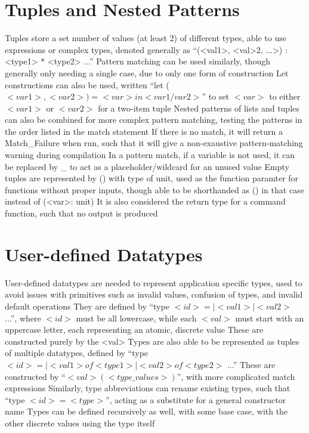\documentclass[11 pt, twoside]{article}
\newenvironment{outline*}
{
	\begin{outline}[enumerate]
	}
	{\end{outline}
}
\begin{document}
\section{Tuples and Nested Patterns}
\begin{outline*}
\1 Tuples store a set number of values (at least 2) of different types, able to use expressions or complex types, denoted generally as ``(<val1>, <val>2, ...>) : <type1> * <type2> ...''
\2 Pattern matching can be used similarly, though generally only needing a single case, due to only one form of construction
\3 Let constructions can also be used, written ``let ($<var1>, <var2>) = <var> in <var1/var2>$'' to set $<var>$ to either $<var1>$ or $<var2>$ for a two-item tuple
\3 Nested patterns of lists and tuples can also be combined for more complex pattern matching, testing the patterns in the order listed in the match statement
\3 If there is no match, it will return a Match\_Failure when run, such that it will give a non-exaustive pattern-matching warning during compilation
\3 In a pattern match, if a variable is not used, it can be replaced by \_ to act as a placeholder/wildcard for an unused value
\2 Empty tuples are represented by () with type of unit, used as the function paramter for functions without proper inputs, though able to be shorthanded as () in that case instead of (<var>: unit)
\3 It is also considered the return type for a command function, such that no output is produced
\end{outline*}
\section{User-defined Datatypes}
\begin{outline*}
\1 User-defined datatypes are needed to represent application specific types, used to avoid issues with primitives such as invalid values, confusion of types, and invalid default operations
\2 They are defined by ``type $<id> = | <val1> | <val2>$ ...'', where $<id>$ must be all lowercase, while each $<val>$ must start with an uppercase letter, each representing an atomic, discrete value
	\3 These are constructed purely by the <val>
\2 Types are also able to be represented as tuples of multiple datatypes, defined by ``type $<id> = | <val1> of <type1> | <val2> of <type2>$ ...''
	\3 These are constructed by ``$<val> (<type\_values>)$'', with more complicated match expressions
	\3 Similarly, type abbreviations can rename existing types, such that ``type $<id> = <type>$'', acting as a substitute for a general constructor name
\2 Types can be defined recursively as well, with some base case, with the other discrete values using the type itself
\end{outline*}
\end{document}
